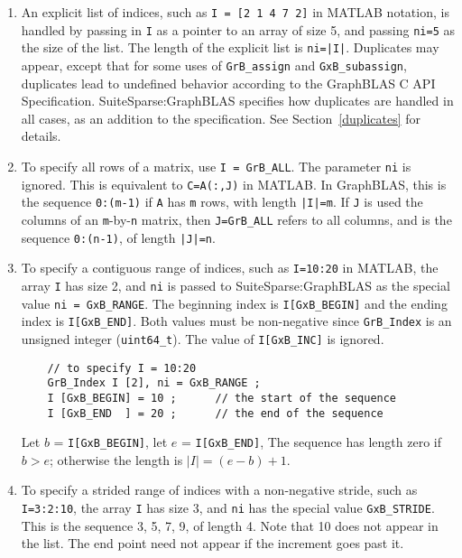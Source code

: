 \documentclass[12pt]{article}
\begin{document}
\begin{enumerate}
\item
    An explicit list of indices, such as \verb'I = [2 1 4 7 2]' in MATLAB
    notation, is handled by passing in \verb'I' as a pointer to an array of
    size 5, and passing \verb'ni=5' as the size of the list.
    The length of the explicit list is \verb'ni=|I|'.
    Duplicates may appear, except that for some uses of \verb'GrB_assign'
    and \verb'GxB_subassign', duplicates lead to undefined behavior
    according to the GraphBLAS C API Specification.
    SuiteSparse:GraphBLAS specifies how duplicates are handled in all cases,
    as an addition to the specification.
    See Section~\ref{duplicates} for details.

\item To specify all rows of a matrix, use \verb'I = GrB_ALL'.  The
    parameter \verb'ni' is ignored.  This is equivalent to \verb'C=A(:,J)'
    in MATLAB.  In GraphBLAS, this is the sequence \verb'0:(m-1)' if \verb'A'
    has \verb'm' rows, with length \verb'|I|=m'.  If \verb'J' is used the
    columns of an \verb'm'-by-\verb'n' matrix, then \verb'J=GrB_ALL' refers to
    all columns, and is the sequence \verb'0:(n-1)', of length \verb'|J|=n'.

\item To specify a contiguous range of indices, such as \verb'I=10:20'
    in MATLAB, the array \verb'I' has size 2, and \verb'ni' is passed to
    SuiteSparse:GraphBLAS as the special value \verb'ni = GxB_RANGE'.  The
    beginning index is \verb'I[GxB_BEGIN]' and the ending index is
    \verb'I[GxB_END]'.   Both values must be non-negative since
    \verb'GrB_Index' is an unsigned integer (\verb'uint64_t').  The value of
    \verb'I[GxB_INC]' is ignored.

    {\footnotesize
    \begin{verbatim}
    // to specify I = 10:20
    GrB_Index I [2], ni = GxB_RANGE ;
    I [GxB_BEGIN] = 10 ;      // the start of the sequence
    I [GxB_END  ] = 20 ;      // the end of the sequence \end{verbatim}}

    Let $b$ = \verb'I[GxB_BEGIN]', let $e$ = \verb'I[GxB_END]',
    The sequence has length zero if $b > e$; otherwise the length is
    $|I| = (e-b) + 1$.

\item To specify a strided range of indices with a non-negative stride,
    such as \verb'I=3:2:10', the array \verb'I' has size 3, and \verb'ni' has
    the special value \verb'GxB_STRIDE'.  This is the sequence 3, 5, 7, 9, of
    length 4.  Note that 10 does not appear in the list.  The end point need
    not appear if the increment goes past it.


\end{enumerate}
\end{document}

